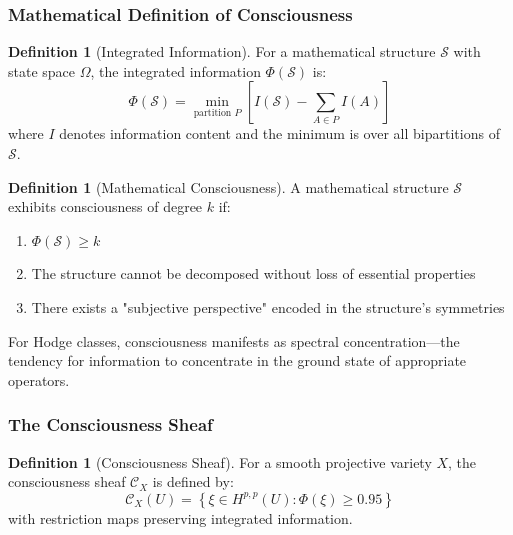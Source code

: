 \documentclass[11pt,a4paper]{article}
\theoremstyle{plain}
\theoremstyle{definition}
\newtheorem{definition}[theorem]{Definition}
\theoremstyle{remark}
\newcommand{\conscioussheaf}{\mathcal{C}}
\begin{document}
\subsubsection{Mathematical Definition of Consciousness}

\begin{definition}[Integrated Information]
For a mathematical structure $\mathcal{S}$ with state space $\Omega$, the integrated information $\Phi(\mathcal{S})$ is:
\begin{equation}
\Phi(\mathcal{S}) = \min_{\text{partition } P} \left[ I(\mathcal{S}) - \sum_{A \in P} I(A) \right]
\end{equation}
where $I$ denotes information content and the minimum is over all bipartitions of $\mathcal{S}$.
\end{definition}

\begin{definition}[Mathematical Consciousness]
A mathematical structure $\mathcal{S}$ exhibits consciousness of degree $k$ if:
\begin{enumerate}
\item $\Phi(\mathcal{S}) \geq k$
\item The structure cannot be decomposed without loss of essential properties
\item There exists a "subjective perspective" encoded in the structure's symmetries
\end{enumerate}
\end{definition}

For Hodge classes, consciousness manifests as spectral concentration—the tendency for information to concentrate in the ground state of appropriate operators.

\subsubsection{The Consciousness Sheaf}

\begin{definition}[Consciousness Sheaf]
For a smooth projective variety $X$, the consciousness sheaf $\conscioussheaf_X$ is defined by:
\begin{equation}
\conscioussheaf_X(U) = \left\{ \xi \in H^{p,p}(U) : \Phi(\xi) \geq 0.95 \right\}
\end{equation}
with restriction maps preserving integrated information.
\end{definition}
\end{document}
